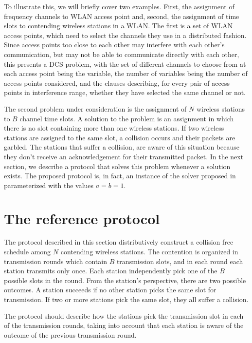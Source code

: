 \documentclass[journal]{IEEEtran}
\begin{document}
To illustrate this, we will briefly cover two examples. 
First, the assignment of frequency channels to WLAN access point and, second, the assignment of time slots to contending wireless stations in a WLAN.
The first is a set of WLAN access points, which need to select the channels they use in a distributed fashion. Since access points too close to each other may interfere with each other's communication, but may not be able to communicate directly with each other, this presents a DCS problem, with the set of different channels to choose from at each access point being the variable, the number of variables being the number of access points considered, and the clauses describing, for every pair of access points in interference range, whether they have selected the same channel or not.

The second problem under consideration is the assignment of $N$ wireless stations to $B$ channel time slots.
A solution to the problem is an assignment in which there is no slot containing more than one wireless stations.
If two wireless stations are assigned to the same slot, a collision occurs and their packets are garbled.
The stations that suffer a collision, are aware of this situation because they don't receive an acknowledgement for their transmitted packet.
In the next section, we describe a protocol that solves this problem whenever a solution exists.
The proposed protocol is, in fact, an instance of the solver proposed in \cite{duffy2011dcs} parameterized with the values $a=b=1$.

\section{The reference protocol}

The protocol described in this section distributively construct a collision free schedule among $N$ contending wireless stations.
The contention is organized in transmission rounds which contain $B$ transmission slots, and in each round each station transmits only once.
Each station independently pick one of the $B$ possible slots in the round.
From the station's perspective, there are two possible outcomes.
A station succeeds if no other station picks the same slot for transmission.
If two or more stations pick the same slot, they all suffer a collision.

The protocol should describe how the stations pick the transmission slot in each of the transmission rounds, taking into account that each station is aware of the outcome of the previous transmission round.
\end{document}
